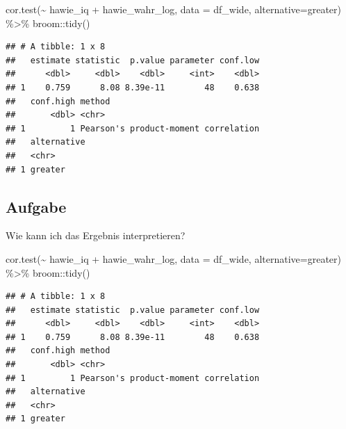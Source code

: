 \documentclass[
]{book}
\newenvironment{Shaded}{\begin{snugshade}}{\end{snugshade}}
\newcommand{\AttributeTok}[1]{\textcolor[rgb]{0.77,0.63,0.00}{#1}}
\newcommand{\FunctionTok}[1]{\textcolor[rgb]{0.00,0.00,0.00}{#1}}
\newcommand{\NormalTok}[1]{#1}
\newcommand{\SpecialCharTok}[1]{\textcolor[rgb]{0.00,0.00,0.00}{#1}}
\newcommand{\StringTok}[1]{\textcolor[rgb]{0.31,0.60,0.02}{#1}}
\begin{document}
\begin{Shaded}
\begin{Highlighting}[]
\FunctionTok{cor.test}\NormalTok{(}\SpecialCharTok{\textasciitilde{}}\NormalTok{ hawie\_iq }\SpecialCharTok{+}\NormalTok{ hawie\_wahr\_log, }
         \AttributeTok{data =}\NormalTok{ df\_wide,}
         \AttributeTok{alternative=}\StringTok{\textquotesingle{}greater\textquotesingle{}}\NormalTok{) }\SpecialCharTok{\%\textgreater{}\%} 
\NormalTok{  broom}\SpecialCharTok{::}\FunctionTok{tidy}\NormalTok{()}
\end{Highlighting}
\end{Shaded}

\begin{verbatim}
## # A tibble: 1 x 8
##   estimate statistic  p.value parameter conf.low
##      <dbl>     <dbl>    <dbl>     <int>    <dbl>
## 1    0.759      8.08 8.39e-11        48    0.638
##   conf.high method                              
##       <dbl> <chr>                               
## 1         1 Pearson's product-moment correlation
##   alternative
##   <chr>      
## 1 greater
\end{verbatim}

\hypertarget{aufgabe-1}{%
\subsection{Aufgabe}\label{aufgabe-1}}

Wie kann ich das Ergebnis interpretieren?

\begin{Shaded}
\begin{Highlighting}[]
\FunctionTok{cor.test}\NormalTok{(}\SpecialCharTok{\textasciitilde{}}\NormalTok{ hawie\_iq }\SpecialCharTok{+}\NormalTok{ hawie\_wahr\_log, }
         \AttributeTok{data =}\NormalTok{ df\_wide,}
         \AttributeTok{alternative=}\StringTok{\textquotesingle{}greater\textquotesingle{}}\NormalTok{) }\SpecialCharTok{\%\textgreater{}\%} 
\NormalTok{  broom}\SpecialCharTok{::}\FunctionTok{tidy}\NormalTok{()}
\end{Highlighting}
\end{Shaded}

\begin{verbatim}
## # A tibble: 1 x 8
##   estimate statistic  p.value parameter conf.low
##      <dbl>     <dbl>    <dbl>     <int>    <dbl>
## 1    0.759      8.08 8.39e-11        48    0.638
##   conf.high method                              
##       <dbl> <chr>                               
## 1         1 Pearson's product-moment correlation
##   alternative
##   <chr>      
## 1 greater
\end{verbatim}
\end{document}

